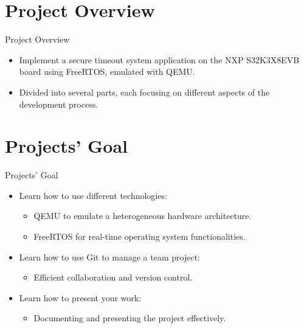 
\section{Project Overview}

\begin{frame}{Project Overview}
    \begin{itemize}
        \item Implement a secure timeout system application on the NXP S32K3X8EVB board using FreeRTOS, emulated with QEMU.
        \item Divided into several parts, each focusing on different aspects of the development process.
    \end{itemize}
\end{frame}

\section{Projects’ Goal}

\begin{frame}{Projects’ Goal}
    \begin{itemize}
        \item Learn how to use different technologies:
        \begin{itemize}
            \item QEMU to emulate a heterogeneous hardware architecture.
            \item FreeRTOS for real-time operating system functionalities.
        \end{itemize}
        \item Learn how to use Git to manage a team project:
        \begin{itemize}
            \item Efficient collaboration and version control.
        \end{itemize}
        \item Learn how to present your work:
        \begin{itemize}
            \item Documenting and presenting the project effectively.
        \end{itemize}
    \end{itemize}
\end{frame}
